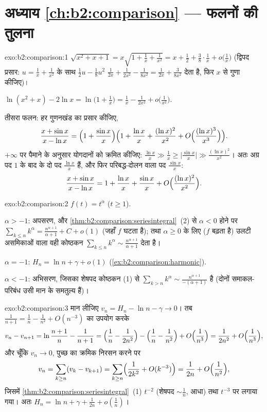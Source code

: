 \section*{अध्याय \ref{ch:b2:comparison} --- फलनों की तुलना}

\begin{solution}{exo:b2:comparison:1}
$\sqrt{x^2 + x + 1} = x\sqrt{1 + \tfrac1x + \tfrac{1}{x^2}} = x +
\frac12 + \frac38\cdot\frac1x + o\bigl(\frac1x\bigr)$ (द्विपद प्रसार: $u = \frac1x +
\frac{1}{x^2}$ के साथ $\frac12 u - \frac18 u^2$ $\frac{1}{2x} + \frac{1}{2x^2} -
\frac{1}{8x^2} = \frac{1}{2x} + \frac{3}{8x^2}$ देता है, फिर $x$ से गुणा कीजिए)।

$\ln(x^2 + x) - 2\ln x = \ln\bigl(1 + \tfrac1x\bigr) = \frac1x -
\frac{1}{2x^2} + o\bigl(\frac{1}{x^2}\bigr)$.

तीसरा फलन: हर गुणनखंड का प्रसार कीजिए,
\[
\frac{x + \sin x}{x - \ln x}
= \Bigl(1 + \frac{\sin x}{x}\Bigr)
\Bigl(1 + \frac{\ln x}{x} + \frac{(\ln x)^2}{x^2} +
O\Bigl(\frac{(\ln x)^3}{x^3}\Bigr)\Bigr).
\]
$+\infty$ पर पैमाने के अनुसार योगदानों को क्रमित कीजिए: $\frac{\ln x}{x}
\gg \frac{1}{x} \geq \bigl|\frac{\sin x}{x}\bigr| \gg \frac{(\ln
x)^2}{x^2}$। अतः अग्र पद $1$
के बाद के दो पद $\frac{\ln x}{x}$ हैं, और फिर परिबद्ध-दोलन वाला पद $\frac{\sin
x}{x}$:
\[
\frac{x + \sin x}{x - \ln x}
= 1 + \frac{\ln x}{x} + \frac{\sin x}{x}
+ O\Bigl(\frac{(\ln x)^2}{x^2}\Bigr).
\]
\end{solution}

\begin{solution}{exo:b2:comparison:2}
$f(t) = t^\alpha$ ($t \geq 1$).

$\alpha > -1$: अपसरण, और \cref{thm:b2:comparison:seriesintegral}~(2) से $\alpha <
0$ होने पर $\sum_{k\leq n}
k^\alpha = \frac{n^{\alpha+1}}{\alpha+1} + C + o(1)$ (जहाँ $f$ घटता है); तथा $\alpha \geq 0$
के लिए ($f$ बढ़ता है) उलटी असमिकाओं वाला वही कोष्ठकन $\sum_{k \leq n}
k^\alpha \sim \frac{n^{\alpha + 1}}{\alpha + 1}$ देता है।

$\alpha = -1$: $H_n = \ln n + \gamma + o(1)$
(\cref{ex:b2:comparison:harmonic}).

$\alpha < -1$: अभिसरण, जिसका शेषपद कोष्ठकन (1) से $\sum_{k > n} k^\alpha
\sim \frac{n^{\alpha+1}}{-(\alpha+1)}$ है (दोनों समाकल-परिबंध उसी
मान के समतुल्य हैं)।
\end{solution}

\begin{solution}{exo:b2:comparison:3}
मान लीजिए $v_n = H_n - \ln n - \gamma \to 0$। तब $\frac{1}{n+1} = \frac1n - \frac{1}{n^2} + O(n^{-3})$ का उपयोग करके
\[
v_n - v_{n+1} = \ln\frac{n+1}{n} - \frac{1}{n+1}
= \Bigl(\frac1n - \frac{1}{2n^2}\Bigr) - \Bigl(\frac1n -
\frac{1}{n^2}\Bigr) + O\Bigl(\frac{1}{n^3}\Bigr)
= \frac{1}{2n^2} + O\Bigl(\frac{1}{n^3}\Bigr),
\]
और चूँकि $v_n \to 0$, पुच्छ का क्रमिक निरसन करने पर
\[
v_n = \sum_{k \geq n} (v_k - v_{k+1})
= \sum_{k\geq n} \Bigl(\frac{1}{2k^2} + O(k^{-3})\Bigr)
= \frac{1}{2n} + O\Bigl(\frac{1}{n^2}\Bigr),
\]
जिसमें \cref{thm:b2:comparison:seriesintegral}~(1) $t^{-2}$ (शेषपद $\sim \frac1n$, आधा) तथा $t^{-3}$ पर लगाया गया। अतः $H_n =
\ln n + \gamma + \frac{1}{2n} + o(\frac1n)$।
\end{solution}

